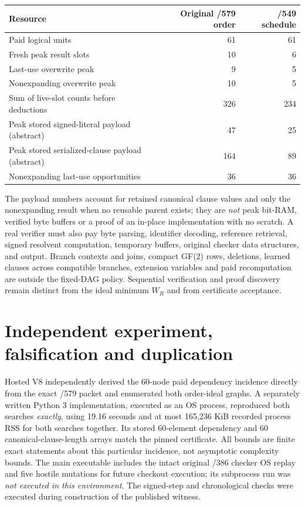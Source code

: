 \documentclass[11pt]{article}
\begin{document}
\begin{center}
\begin{tabular}{lrr}
\toprule
Resource & Original /579 order & /549 schedule\\
\midrule
Paid logical units & 61 & 61\\
Fresh peak result slots & 10 & 6\\
Last-use overwrite peak & 9 & 5\\
Nonexpanding overwrite peak & 10 & 5\\
Sum of live-slot counts before deductions & 326 & 234\\
Peak stored signed-literal payload (abstract) & 47 & 25\\
Peak stored serialized-clause payload (abstract) & 164 & 89\\
Nonexpanding last-use opportunities & 36 & 36\\
\bottomrule
\end{tabular}
\end{center}
The payload numbers account for retained canonical clause values and only the nonexpanding result when no reusable parent exists; they are \emph{not} peak bit-RAM, verified byte buffers or a proof of an in-place implementation with no scratch. A real verifier must also pay byte parsing, identifier decoding, reference retrieval, signed resolvent computation, temporary buffers, original checker data structures, and output. Branch contexts and joins, compact GF(2) rows, deletions, learned clauses across compatible branches, extension variables and paid recomputation are outside the fixed-DAG policy. Sequential verification and proof discovery remain distinct from the ideal minimum $W_R$ and from certificate acceptance.

\section*{Independent experiment, falsification and duplication}
Hosted V8 independently derived the 60-node paid dependency incidence directly from the exact /579 packet and enumerated both order-ideal graphs. A separately written Python 3 implementation, executed as an OS process, reproduced both searches \emph{exactly}, using 19.16 seconds and at most 165,236 KiB recorded process RSS for both searches together. Its stored 60-element dependency and 60 canonical-clause-length arrays match the pinned certificate. All bounds are finite exact statements about this particular incidence, not asymptotic complexity bounds. The main executable includes the intact original /386 checker OS replay and five hostile mutations for future checkout execution; its subprocess run was \emph{not executed in this environment}. The signed-step and chronological checks were executed during construction of the published witness.
\end{document}
